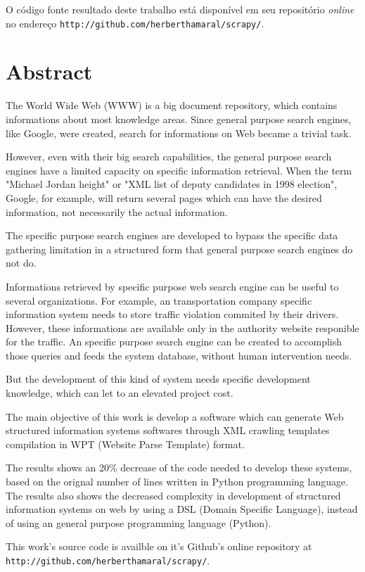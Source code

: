 O código fonte resultado deste trabalho está disponível em seu repositório \emph{online} no endereço \texttt{http://github.com/herberthamaral/scrapy/}.

\pagebreak

\chapter{Abstract}

The World Wide Web (WWW) is a big document repository, which contains informations about most knowledge areas. Since general purpose search engines, like Google, were created, search for informations on Web became a trivial task.

However, even with their big search capabilities, the general purpose search engines have a limited capacity on specific information retrieval. When the term "Michael Jordan height" or "XML list of deputy candidates in 1998 election", Google, for example, will return several pages which can have the desired information, not necessarily the actual information.

The specific purpose search engines are developed to bypass the specific data gathering limitation in a structured form that general purpose search engines do not do.

Informations retrieved by specific purpose web search engine can be useful to several organizations. For example, an transportation company specific information system needs to store traffic violation commited by their drivers. However, these informations are available only in the authority website responible for the traffic. An specific purpose search engine can be created to accomplish those queries and feeds the system database, without human intervention needs.

But the development of this kind of system needs specific development knowledge, which can let to an elevated project cost.

The main objective of this work is develop a software which can generate Web structured information systems softwares through XML crawling templates compilation in WPT (Website Parse Template) format.

The results shows an 20\% decrease of the code needed to develop these systems, based on the orignal number of lines written in Python programming language. The results also shows the decreased complexity in development of structured information systems on web by using a DSL (Domain Specific Language), instead of using an general purpose programming language (Python).

This work's source code is availble on it's Github's online repository at \texttt{http://github.com/herberthamaral/scrapy/}.